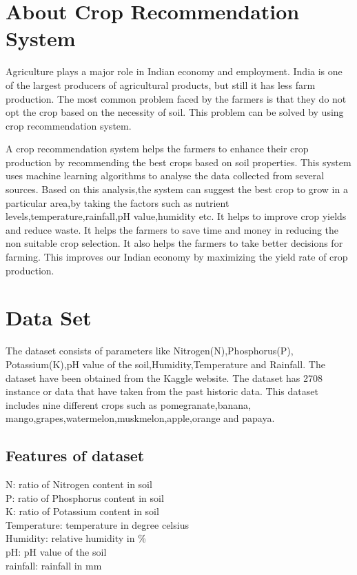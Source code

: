

\section{About Crop Recommendation System}
       Agriculture plays a major role in Indian economy and employment. India is one of the largest producers of agricultural products, but still it has less farm production. The most common problem faced by the farmers is that they do not opt the crop based on the necessity of soil. This problem can be solved by using crop recommendation system.\par
A crop recommendation system helps the farmers to enhance their crop production by recommending the best crops based on soil properties. This system uses machine learning algorithms to analyse the data collected from several sources. Based on this analysis,the system can  suggest the best crop to grow in a particular area,by taking the factors such as nutrient levels,temperature,rainfall,pH value,humidity etc. It helps to improve crop yields and reduce waste. It helps the farmers to save time and money in reducing the non suitable crop selection. It also helps the farmers to take better decisions for farming. This improves our Indian economy by maximizing the yield rate of crop production.
\section{Data Set}
     The dataset consists of parameters like Nitrogen(N),Phosphorus(P),
Potassium(K),pH value of the soil,Humidity,Temperature and Rainfall. The dataset have been obtained from the Kaggle website. The dataset has 2708 instance or data that have taken from the past historic data. This dataset includes nine different crops such as pomegranate,banana,
mango,grapes,watermelon,muskmelon,apple,orange and papaya.
\subsection*{Features of dataset}
N: ratio of Nitrogen content in soil\\P: ratio of Phosphorus content in soil\\K: ratio of Potassium content in soil\\Temperature: temperature in degree celsius\\Humidity: relative humidity in \%\\pH: pH value of the soil\\rainfall: rainfall in mm
